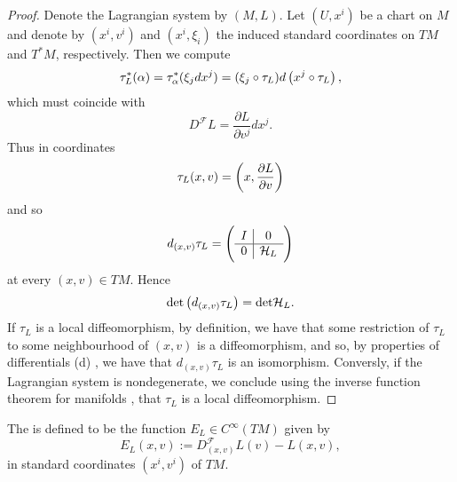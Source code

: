 \begin{proof}
	Denote the Lagrangian system by $(M,L)$. Let $(U,x^i)$ be a chart on $M$ and denote by $(x^i,v^i)$ and $(x^i,\xi_i)$ the induced standard coordinates on $TM$ and $T^*M$, respectively. Then we compute
	\begin{equation*}
		\tau^*_L(\alpha) = \tau^*_\alpha(\xi_j dx^j) = (\xi_j \circ \tau_L)d\del[1]{x^j \circ \tau_L},
	\end{equation*}
	\noindent which must coincide with
	\begin{equation*}
		D^\mathcal{F}L = \frac{\partial L}{\partial v^j}dx^j.
	\end{equation*}
	Thus in coordinates
	\begin{equation}
		\label{eq:Legendre_in_coordinates}
		\tau_L(x,v) = \del[3]{x,\frac{\partial L}{\partial v}}
	\end{equation}
	\noindent and so
	\begin{equation*}
		d_{(x,v)}\tau_L = \del{\begin{array}{c|c}
			I & 0\\\hline
			0 & \mathcal{H}_L
		\end{array}}
	\end{equation*}
	\noindent at every $(x,v) \in TM$. Hence 
	\begin{equation*}
		\det \del[1]{d_{(x,v)}\tau_L} = \det \mathcal{H}_L.
	\end{equation*}
	If $\tau_L$ is a local diffeomorphism, by definition, we have that some restriction of $\tau_L$ to some neighbourhood of $(x,v)$ is a diffeomorphism, and so, by properties of differentials (d) \cite[55]{lee:smooth_manifolds:2013}, we have that $d_{(x,v)}\tau_L$ is an isomorphism. Conversly, if the Lagrangian system is nondegenerate, we conclude using the inverse function theorem for manifolds \cite[79]{lee:smooth_manifolds:2013}, that $\tau_L$ is a local diffeomorphism.
\end{proof}

\begin{definition}[Energy]
	\label{def:energy}
	The  is defined to be the function $E_L \in C^\infty(TM)$ given by
	\begin{equation*}
		E_L(x,v) := D^\mathcal{F}_{(x,v)}L(v) - L(x,v),
	\end{equation*}
	\noindent in standard coordinates $(x^i,v^i)$ of $TM$.
\end{definition}

